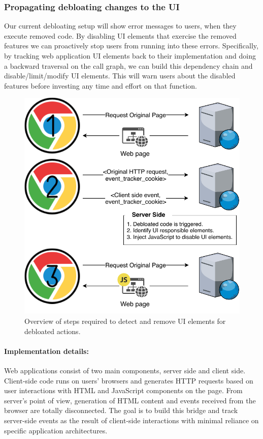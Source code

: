 \subsubsection{Propagating debloating changes to the UI}
Our current debloating setup will show error messages to users, when
they execute removed code. By disabling UI elements that exercise the
removed features we can proactively stop users from running into these
errors. Specifically, by tracking web application UI elements back to their
implementation and doing a backward traversal on the call graph, we can build
this dependency chain and disable/limit/modify UI elements. This will warn
users about the disabled features before investing any time and effort on
that function.

\begin{figure}[t]
  \centering
  \includegraphics[width=0.7\linewidth]{figures/UI-backend-debloating.pdf}
  \caption{Overview of steps required to detect and remove UI elements for debloated actions.}
  \label{fig:uidebloating}
\end{figure}

\paragraph{Implementation details:} Web applications consist of two main components, server side and client side. Client-side code runs on users' browsers and generates HTTP requests based on user interactions with HTML and JavaScript components on the page. From server's point of view, generation of HTML content and events received from the browser are totally disconnected. The goal is to build this bridge and track server-side events as the result of client-side interactions with minimal reliance on specific application architectures.

